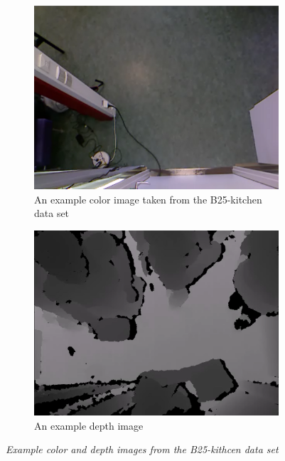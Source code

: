 \newpage

\begin{figure}[H]
\centering
\begin{subfigure}{.5\textwidth}
  \centering
  \includegraphics[width=0.9\linewidth]{images/B25-Kitchen-color.png}
  \caption{An example color image taken from the B25-kitchen data set}
  \label{fig:sub1}
\end{subfigure}%
\begin{subfigure}{.5\textwidth}
  \centering
  \includegraphics[width=0.9\linewidth]{images/B25-Kitchen-folk.png}
  \caption{An example depth image}
  \label{fig:sub2}
\end{subfigure}
\caption[R-kitchen exits]{\textit{Example color and depth images from the B25-kithcen data set}}
\label{fig:B25-kitchen example}
\end{figure}

